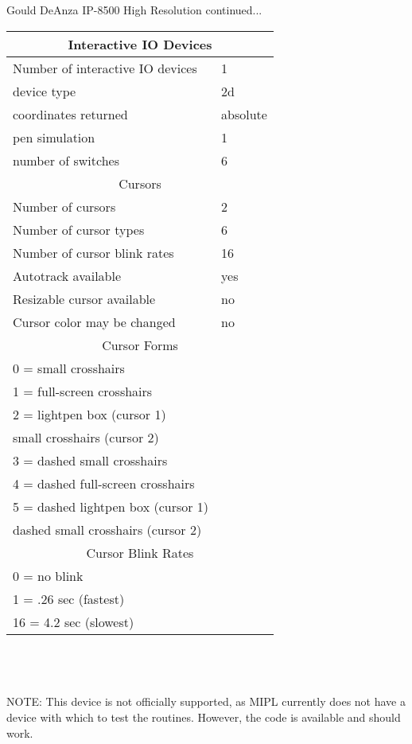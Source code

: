 \newpage
Gould DeAnza IP-8500 High Resolution continued...\\
\begin{tabular}{|l l|}
\hline 
\multicolumn{2}{|c|}{Interactive IO Devices}\\ 
\hline
Number of interactive IO devices & 1\\
device type & 2d\\
coordinates returned & absolute\\
pen simulation & 1\\
number of switches & 6\\
\hline \hline 
\multicolumn{2}{|c|}{Cursors}\\ 
\hline
Number of cursors & 2\\
Number of cursor types & 6\\
Number of cursor blink rates & 16\\
Autotrack available & yes\\
Resizable cursor available & no\\
Cursor color may be changed & no\\
\hline \hline 
\multicolumn{2}{|c|}{Cursor Forms}\\
\hline
0 = small crosshairs & \\
1 = full-screen crosshairs & \\
2 = lightpen box (cursor 1) & \\
small crosshairs (cursor 2) & \\
3 = dashed small crosshairs & \\
4 = dashed full-screen crosshairs & \\
5 = dashed lightpen box (cursor 1) & \\
dashed small crosshairs (cursor 2) & \\
\hline \hline 
\multicolumn{2}{|c|}{Cursor Blink Rates}\\
\hline
0 = no blink & \\
1 = .26 sec (fastest) & \\
16 = 4.2 sec (slowest) & \\ \hline
\end{tabular}
\\
\\
\\
NOTE:  This device is not officially supported, as MIPL currently
does not have a device with which to test the routines.  However,
the code is available and should work.
\newpage
